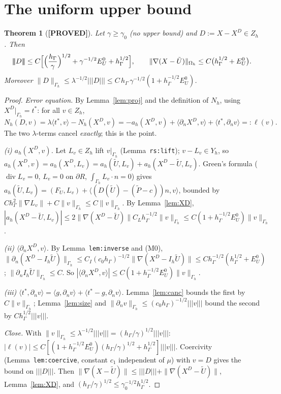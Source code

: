 \documentclass[11pt]{article}
\newtheorem{theorem}{Theorem}
\theoremstyle{remark}
\newcommand{\hG}{h_\Gamma}
\newcommand{\Gh}{\Gamma_h}
\newcommand{\Oh}{\Omega_h}
\newcommand{\Zh}{Z_h}
\newcommand{\Yh}{Y_h}
\newcommand{\norm}[1]{\|#1\|}
\newcommand{\tnorm}[1]{|\!|\!|#1|\!|\!|}
\newcommand{\ip}[2]{\langle #1,#2\rangle}
\newcommand{\dn}{\partial_n}
\newcommand{\Ut}{\tilde U}
\newcommand{\Pt}{\tilde P}
\newcommand{\EU}{E^{0}_{U}}
\renewcommand{\div}{\operatorname{div}}
\newcommand{\lab}[1]{\textbf{[#1]}}
\begin{document}
\section{The uniform upper bound}
\begin{theorem}[\lab{PROVED}]\label{thm:up}
Let $\gamma\ge\gamma_0$ (no upper bound) and $D:=X-X^D\in\Zh$. Then
\[
\tnorm{D}\le C\Bigl[\Bigl(\frac{\hG}{\gamma}\Bigr)^{1/2}+\gamma^{-1/2}\EU+\hG^{1/2}\Bigr],\qquad
\norm{\nabla(X-\Ut)}_{\Oh}\le C\bigl(\hG^{1/2}+\EU\bigr).
\]
Moreover $\norm{D}_{\Gh}\le\lambda^{-1/2}\tnorm D\le C\,\hG\,\gamma^{-1/2}(1+\hG^{-1/2}\EU)$.
\end{theorem}
\begin{proof}
\emph{Error equation.} By Lemma~\ref{lem:proj} and the definition of $N_h$, using $X^D|_{\Gh}=t^\ast$: for all $v\in\Zh$,
\[
N_h(D,v)=\lambda\ip{t^\ast}{v}-N_h(X^D,v)=-a_h(X^D,v)+\ip{\dn X^D}{v}+\ip{t^\ast}{\dn v}=:\ell(v).
\]
The two $\lambda$-terms cancel \emph{exactly}; this is the point.

\emph{(i) $a_h(X^D,v)$.} Let $L_v\in\Zh$ lift $v|_{\Gh}$ (Lemma~\texttt{rs:lift}); $v-L_v\in\Yh$, so $a_h(X^D,v)=a_h(X^D,L_v)=a_h(\Ut,L_v)+a_h(X^D-\Ut,L_v)$. Green's formula ($\div L_v=0$, $L_v=0$ on $\partial R$, $\int_{\Gh}L_v\cdot n=0$) gives
$a_h(\Ut,L_v)=(F_U,L_v)+\ip{(D(\Ut)-(\Pt-c))n}{v}$, bounded by $C\hG^2\norm{\nabla L_v}+C\norm v_{\Gh}\le C\norm v_{\Gh}$. By Lemma~\ref{lem:XD}, $|a_h(X^D-\Ut,L_v)|\le2\norm{\nabla(X^D-\Ut)}C_L\hG^{-1/2}\norm v_{\Gh}\le C(1+\hG^{-1/2}\EU)\norm v_{\Gh}$.

\emph{(ii) $\ip{\dn X^D}{v}$.} By Lemma~\texttt{lem:inverse} and (M0), $\norm{\dn(X^D-I_h\Ut)}_{\Gh}\le C_I(c_0\hG)^{-1/2}\norm{\nabla(X^D-I_h\Ut)}\le C\hG^{-1/2}(\hG^{1/2}+\EU)$; $\norm{\dn I_h\Ut}_{\Gh}\le C$. So $|\ip{\dn X^D}{v}|\le C(1+\hG^{-1/2}\EU)\norm v_{\Gh}$.

\emph{(iii) $\ip{t^\ast}{\dn v}=\ip{g}{\dn v}+\ip{t^\ast-g}{\dn v}$.} Lemma~\ref{lem:canc} bounds the first by $C\norm v_{\Gh}$; Lemma~\ref{lem:size} and $\norm{\dn v}_{\Gh}\le(c_0\hG)^{-1/2}\tnorm v$ bound the second by $C\hG^{1/2}\tnorm v$.

\emph{Close.} With $\norm v_{\Gh}\le\lambda^{-1/2}\tnorm v=(\hG/\gamma)^{1/2}\tnorm v$:
$|\ell(v)|\le C[(1+\hG^{-1/2}\EU)(\hG/\gamma)^{1/2}+\hG^{1/2}]\tnorm v$. Coercivity (Lemma~\texttt{lem:coercive}, constant $c_1$ independent of $\mu$) with $v=D$ gives the bound on $\tnorm D$. Then $\norm{\nabla(X-\Ut)}\le\tnorm D+\norm{\nabla(X^D-\Ut)}$, Lemma~\ref{lem:XD}, and $(\hG/\gamma)^{1/2}\le\gamma_0^{-1/2}\hG^{1/2}$.
\end{proof}
\end{document}
